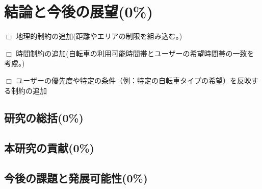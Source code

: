 \section{結論と今後の展望(0\%)}
  \label{sec:結論と今後の展望}
    \par $\Box$ 地理的制約の追加(距離やエリアの制限を組み込む。)
    \par $\Box$ 時間制約の追加(自転車の利用可能時間帯とユーザーの希望時間帯の一致を考慮。)
    \par $\Box$ ユーザーの優先度や特定の条件（例：特定の自転車タイプの希望）を反映する制約の追加
  
  \subsection{研究の総括(0\%)}
    \label{sec:研究の総括}
      \par
      
  \subsection{本研究の貢献(0\%)}
    \label{sec:本研究の貢献}
      \par
      
  \subsection{今後の課題と発展可能性(0\%)}
    \label{sec:今後の課題と発展可能性}
      \par
